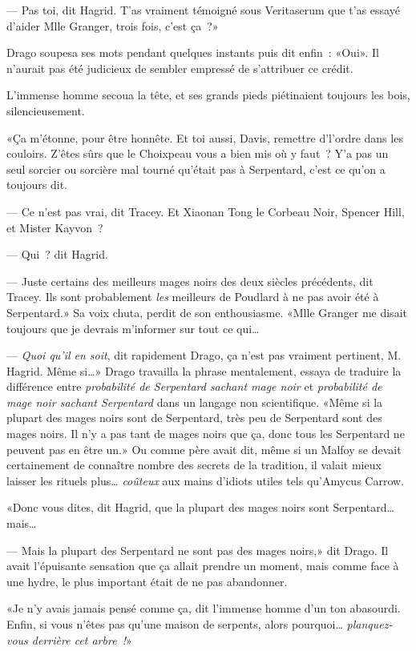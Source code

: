 --- Pas toi, dit Hagrid. T'as vraiment témoigné sous Veritaserum que t'as essayé d'aider Mlle Granger, trois fois, c'est ça~?»

Drago soupesa ses mots pendant quelques instants puis dit enfin~: «Oui». Il n'aurait pas été judicieux de sembler empressé de s'attribuer ce crédit.

L'immense homme secoua la tête, et ses grands pieds piétinaient toujours les bois, silencieusement.

«Ça m'étonne, pour être honnête. Et toi aussi, Davis, remettre d'l'ordre dans les couloirs. Z'êtes sûrs que le Choixpeau vous a bien mis où y faut~? Y'a pas un seul sorcier ou sorcière mal tourné qu'était pas à Serpentard, c'est ce qu'on a toujours dit.

--- Ce n'est pas vrai, dit Tracey. Et Xiaonan Tong le Corbeau Noir, Spencer Hill, et Mister Kayvon~?

--- Qui~? dit Hagrid.

--- Juste certains des meilleurs mages noirs des deux siècles précédents, dit Tracey. Ils sont probablement \emph{les} meilleurs de Poudlard à ne pas avoir été à Serpentard.» Sa voix chuta, perdit de son enthousiasme. «Mlle Granger me disait toujours que je devrais m'informer sur tout ce qui…

--- \emph{Quoi qu'il en soit}, dit rapidement Drago, ça n'est pas vraiment pertinent, M. Hagrid. Même si…» Drago travailla la phrase mentalement, essaya de traduire la différence entre \emph{probabilité de Serpentard sachant mage noir} et \emph{probabilité de mage noir sachant Serpentard} dans un langage non scientifique. «Même si la plupart des mages noirs sont de Serpentard, très peu de Serpentard sont des mages noirs. Il n'y a pas tant de mages noirs que ça, donc tous les Serpentard ne peuvent pas en être un.» Ou comme père avait dit, même si un Malfoy se devait certainement de connaître nombre des secrets de la tradition, il valait mieux laisser les rituels plus… \emph{coûteux} aux mains d'idiots utiles tels qu'Amycus Carrow.

«Donc vous dites, dit Hagrid, que la plupart des mages noirs sont Serpentard… mais…

--- Mais la plupart des Serpentard ne sont pas des mages noirs,» dit Drago. Il avait l'épuisante sensation que ça allait prendre un moment, mais comme face à une hydre, le plus important était de ne pas abandonner.

«Je n'y avais jamais pensé comme ça, dit l'immense homme d'un ton abasourdi. Enfin, si vous n'êtes pas qu'une maison de serpents, alors pourquoi… \emph{planquez-vous derrière cet arbre~!}»


